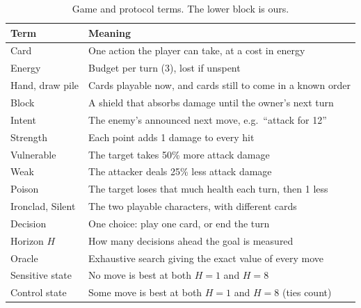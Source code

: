 \begin{table}[t]
\centering
\small
\setlength{\tabcolsep}{4pt}
\begin{tabular}{@{}p{}p{}@{}}
\toprule
Term & Meaning \\
\midrule
Card & One action the player can take, at a cost in energy \\
Energy & Budget per turn (3), lost if unspent \\
Hand, draw pile & Cards playable now, and cards still to come in a known order \\
Block & A shield that absorbs damage until the owner's next turn \\
Intent & The enemy's announced next move, e.g.\ ``attack for 12'' \\
Strength & Each point adds 1 damage to every hit \\
Vulnerable & The target takes 50\% more attack damage \\
Weak & The attacker deals 25\% less attack damage \\
Poison & The target loses that much health each turn, then 1 less \\
Ironclad, Silent & The two playable characters, with different cards \\
\midrule
Decision & One choice: play one card, or end the turn \\
Horizon $H$ & How many decisions ahead the goal is measured \\
Oracle & Exhaustive search giving the exact value of every move \\
Sensitive state & No move is best at both $H{=}1$ and $H{=}8$ \\
Control state & Some move is best at both $H{=}1$ and $H{=}8$ (ties count) \\
\bottomrule
\end{tabular}
\caption{Game and protocol terms. The lower block is ours.}
\label{tab:glossary}
\end{table}
